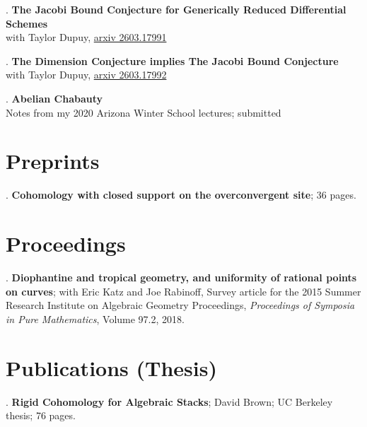 \documentclass[margin,line]{res}
\newcounter{pubs}
\begin{document}
\begin{resume}
 .  \textbf{The Jacobi Bound Conjecture for Generically Reduced Differential Schemes}\\
with Taylor Dupuy, \href{https://arxiv.org/abs/2603.17991}{arxiv 2603.17991}

 .  \textbf{The Dimension Conjecture implies The Jacobi Bound Conjecture}\\
with Taylor Dupuy, \href{https://arxiv.org/abs/2603.17992}{arxiv 2603.17992}

 .  \textbf{Abelian Chabauty}\\
Notes from my 2020 Arizona Winter School lectures; submitted

\section{\sc Preprints}




 .  \textbf{Cohomology with closed support on the overconvergent site}; 36 pages. \vspace{.48cm}\\

\vspace{-7pt}
\section{\sc Proceedings }
 . \textbf{Diophantine and tropical geometry, and uniformity of   rational points on curves}; with Eric Katz and Joe Rabinoff, Survey article for the 2015 Summer Research Institute on Algebraic Geometry Proceedings, \emph{Proceedings of Symposia in Pure Mathematics}, Volume 97.2, 2018. \vspace{.08cm}\\



\section{\sc Publications {(Thesis)}}
 . \textbf{Rigid Cohomology for Algebraic Stacks}; David Brown; UC Berkeley thesis; 76 pages. \vspace{.08cm}\\


\end{resume}
\end{document}
